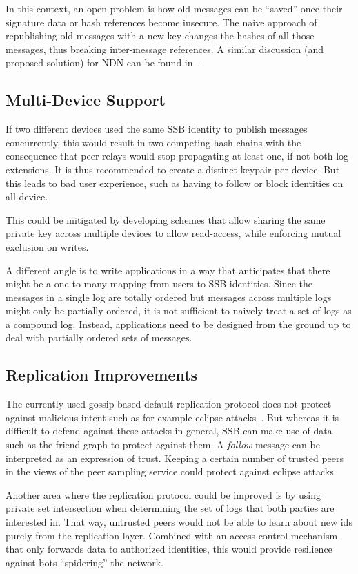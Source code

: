 \documentclass[9pt,sigconf]{acmart}
\begin{document}
In this context, an open problem is how old messages can be ``saved''
once their signature data or hash references become insecure. The
naive approach of republishing old messages with a new key changes the
hashes of all those messages, thus breaking inter-message references.
A similar discussion (and proposed solution) for NDN can be found
in~\cite{DeLorean}.

\subsection{Multi-Device Support}

If two different devices used the same SSB identity to publish
messages concurrently, this would result in two competing hash chains
with the consequence that peer relays would stop propagating at least
one, if not both log extensions. It is thus recommended to create a
distinct keypair per device. But this leads to bad user experience,
such as having to follow or block identities on all device.

This could be mitigated by developing schemes that allow sharing the
same private key across multiple devices to allow read-access, while
enforcing mutual exclusion on writes.

A different angle is to write applications in a way that anticipates
that there might be a one-to-many mapping from users to SSB
identities. Since the messages in a single log are totally ordered but
messages across multiple logs might only be partially ordered, it is
not sufficient to naively treat a set of logs as a compound
log. Instead, applications need to be designed from the ground up to
deal with partially ordered sets of messages.

\subsection{Replication Improvements}

The currently used gossip-based default replication protocol does not
protect against malicious intent such as for example eclipse
attacks~\cite{singh2006eclipse}. But whereas it is difficult to defend
against these attacks in general, SSB can make use of data such as the
friend graph to protect against them. A \textit{follow} message can be
interpreted as an expression of trust. Keeping a certain number of
trusted peers in the views of the peer sampling service could protect
against eclipse attacks.

Another area where the replication protocol could be improved is by
using private set intersection when determining the set of logs that
both parties are interested in. That way, untrusted peers would not be
able to learn about new ids purely from the replication
layer. Combined with an access control mechanism that only forwards
data to authorized identities, this would provide resilience against
bots ``spidering'' the network.
\end{document}
